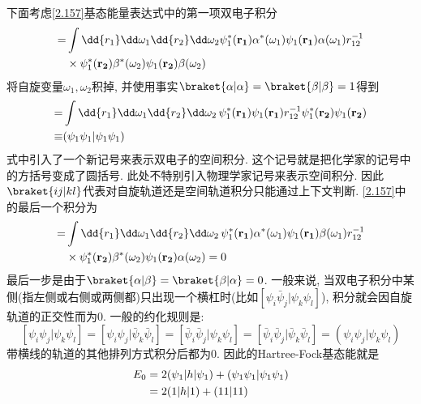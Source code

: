 下面考虑\autoref{2.157}基态能量表达式中的第一项双电子积分
\begin{align}
[{\psi_1\psi_1|\bar{\psi}_1\bar{\psi}_1}] = 
& \int\dd{r_1}\dd\omega_1\dd{r_2}\dd\omega_2\psi_1^*(\mathbf{r_1})\alpha^*(\omega_1)\psi_1(\mathbf{r_1})\alpha(\omega_1) r_{12}^{-1}\notag\\
&\times \psi_1^*(\mathbf{r_2})\beta^*(\omega_2)\psi_1(\mathbf{r_2})\beta(\omega_2)
\end{align}
将自旋变量$\omega_1,\omega_2$积掉,
并使用事实$\braket{\alpha|\alpha}=\braket{\beta|\beta}=1$得到
\begin{align}
[{\psi_1\psi_1|\bar{\psi}_1\bar{\psi}_1}] = & \int\dd{r_1}\dd\omega_1\dd{r_2}\dd\omega_2\,\psi_1^*(\mathbf{r_1})\psi_1(\mathbf{r_1}) r_{12}^{-1}\psi_1^*(\mathbf{r_2})\psi_1(\mathbf{r_2})\notag\\
\equiv  &  (\psi_1\psi_1|\psi_1\psi_1) 
\end{align}
式中引入了一个新记号来表示双电子的空间积分. 
这个记号就是把化学家的记号中的方括号变成了圆括号. 
此处不特别引入物理学家记号来表示空间积分. 
因此$\braket{ij|kl}$代表对自旋轨道还是空间轨道积分只能通过上下文判断. 
\autoref{2.157}中的最后一个积分为
\begin{align}
[{\psi_1\bar{\psi}_1|\bar{\psi}_1\psi_1}] = 
& \int\dd{r_1}\dd\omega_1\dd{r_2}\dd\omega_2\, \psi_1^*(\mathbf{r_1})\alpha^*(\omega_1)\psi_1(\mathbf{r_1})\beta(\omega_1)r_{12}^{-1}\notag\\
& \times \psi_1^*(\mathbf{r_2})\beta^*(\omega_2)\psi_1(\mathbf{r_2})\alpha(\omega_2) = 0
\end{align} 
最后一步是由于$\braket{\alpha|\beta}=\braket{\beta|\alpha} = 0$. 
一般来说, 
当双电子积分中某侧(指左侧或右侧或两侧都)只出现一个横杠时(比如$[\psi_i\bar{\psi}_j|\psi_k\psi_l]$), 
积分就会因自旋轨道的正交性而为0. 
一般的约化规则是:
\begin{equation}
\label{2.165}
[\psi_i\psi_j|\psi_k\psi_l] = 
[\psi_i\psi_j|\bar{\psi}_k\bar{\psi}_l] = [\bar{\psi}_i\bar{\psi}_j|\psi_k\psi_l] = [\bar{\psi}_i\bar{\psi}_j|\bar{\psi}_k\bar{\psi}_l] = (\psi_i\psi_j|\psi_k\psi_l)
\end{equation}
带横线的轨道的其他排列方式积分后都为0. 
因此的Hartree-Fock基态能就是
\begin{align}
E_0 & = 2(\psi_1|h|\psi_1) + (\psi_1\psi_1|\psi_1\psi_1) \notag\\
    & = 2(1|h|1) + (11|11)
\end{align} 
